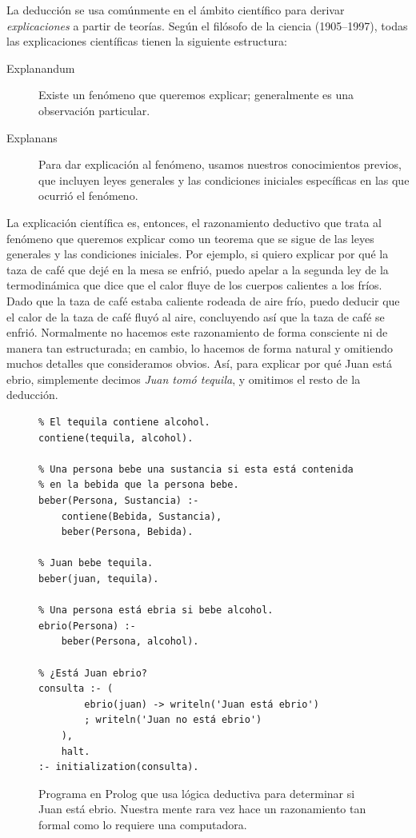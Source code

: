 La deducción se usa comúnmente en el ámbito científico para derivar
\emph{explicaciones} a partir de teorías.
Según el filósofo de la ciencia  (1905--1997),
todas las explicaciones científicas tienen la siguiente estructura:
\begin{description}
    \item[Explanandum] Existe un fenómeno que queremos explicar; generalmente
          es una observación particular.
    \item[Explanans] Para dar explicación al fenómeno, usamos nuestros
          conocimientos previos, que incluyen leyes generales y las condiciones
          iniciales específicas en las que ocurrió el fenómeno.
\end{description}

La explicación científica es, entonces, el razonamiento deductivo que trata al
fenómeno que queremos explicar como un teorema que se sigue de las leyes
generales y las condiciones iniciales.
Por ejemplo, si quiero explicar por qué la taza de café que dejé en la mesa se
enfrió, puedo apelar a la segunda ley de la termodinámica que dice que el calor
fluye de los cuerpos calientes a los fríos.
Dado que la taza de café estaba caliente rodeada de aire frío, puedo deducir que
el calor de la taza de café fluyó al aire, concluyendo así que la taza de café
se enfrió.
Normalmente no hacemos este razonamiento de forma consciente ni de manera tan
estructurada; en cambio, lo hacemos de forma natural y omitiendo muchos detalles
que consideramos obvios.
Así, para explicar por qué Juan está ebrio, simplemente decimos \emph{Juan tomó
    tequila}, y omitimos el resto de la deducción.

\begin{figure}
    \centering
    \begin{verbatim}
% El tequila contiene alcohol.
contiene(tequila, alcohol).

% Una persona bebe una sustancia si esta está contenida
% en la bebida que la persona bebe.
beber(Persona, Sustancia) :-
    contiene(Bebida, Sustancia),
    beber(Persona, Bebida).

% Juan bebe tequila.
beber(juan, tequila).

% Una persona está ebria si bebe alcohol.
ebrio(Persona) :-
    beber(Persona, alcohol).

% ¿Está Juan ebrio?
consulta :- (
        ebrio(juan) -> writeln('Juan está ebrio')
        ; writeln('Juan no está ebrio')
    ),
    halt.
:- initialization(consulta).
\end{verbatim}
    \caption{Programa en Prolog que usa lógica deductiva para determinar si
        Juan está ebrio.
        Nuestra mente rara vez hace un razonamiento tan formal como lo requiere
        una computadora.}
\end{figure}

